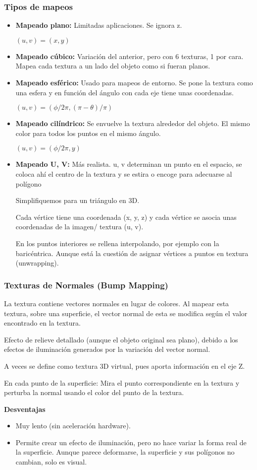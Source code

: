 \subsubsection{Tipos de mapeos}
\begin{itemize}
	\item \textbf{Mapeado plano:} Limitadas aplicaciones. Se ignora z.
	      
	      $(u, v)=(x, y)$
	\item \textbf{Mapeado cúbico:} Variación del anterior, pero con 6 texturas, 1 por cara. Mapea cada textura a un lado del objeto como si fueran planos.
	\item \textbf{Mapeado esférico:} Usado para mapeos de entorno. Se pone la textura como una esfera y en función del ángulo con cada eje tiene unas coordenadas.
	      
	      $(u,v)=(\phi / 2 \pi, (\pi - \theta)/\pi)$
	\item \textbf{Mapeado cilíndrico:} Se envuelve la textura alrededor del objeto. El mismo color para todos los puntos en el mismo ángulo.
	      
	      $(u,v)=(\phi / 2 \pi, y)$
	\item \textbf{Mapeado U, V:} Más realista. u, v determinan un punto en el espacio, se coloca ahí el centro de la textura y se estira o encoge para adecuarse al polígono
	      
	      Simplifiquemos para un triángulo en 3D. 
	      
	      Cada vértice tiene una coordenada (x, y, z) y cada vértice se asocia unas coordenadas de la imagen/ textura (u, v).
	      
	      En los puntos interiores se rellena interpolando, por ejemplo con la baricéntrica. Aunque está la cuestión de asignar vértices  a puntos en textura (unwrapping).
\end{itemize}

\subsubsection{Texturas de Normales (Bump Mapping)}
La textura contiene vectores normales en lugar de colores. Al mapear esta textura, sobre una superficie, el vector normal de esta se modifica según el valor encontrado en la textura. 

Efecto de relieve detallado (aunque el objeto original sea plano), debido a los efectos de iluminación generados por la variación del vector normal. 

A veces se define como textura 3D virtual, pues aporta información en el eje Z.

En cada punto de la superficie: Mira el punto correspondiente en la textura y perturba la normal usando el color del punto de la textura.

\textbf{Desventajas}
\begin{itemize}
	\item Muy lento (sin aceleración hardware).
	\item Permite crear un efecto de iluminación, pero no hace variar la forma real de la superficie. Aunque parece deformarse, la superficie y sus polígonos no cambian, solo es visual.
\end{itemize}